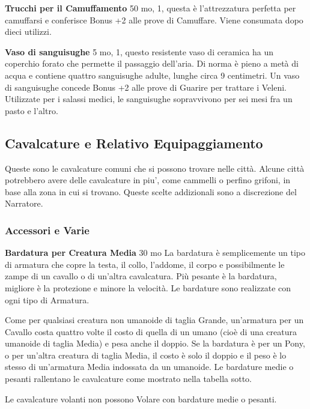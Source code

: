 \documentclass[a4paper,11pt,twoside,openany]{book}
\begin{document}
{\textbf{Trucchi per il Camuffamento} 50 mo, 1, questa è l'attrezzatura perfetta per camuffarsi e conferisce Bonus +2 alle prove di Camuffare. Viene consumata dopo dieci utilizzi.

\textbf{Vaso di sanguisughe} 5 mo, 1, questo resistente vaso di ceramica ha un coperchio forato che permette il passaggio dell'aria. Di norma è pieno a metà di acqua e contiene quattro sanguisughe adulte, lunghe circa 9 centimetri.
Un vaso di sanguisughe concede Bonus +2 alle prove di Guarire per trattare i Veleni. Utilizzate per i salassi medici, le sanguisughe sopravvivono per sei mesi fra un pasto e l'altro.

\pagebreak

\subsection{Cavalcature e Relativo Equipaggiamento}

\label{cavalcature-e-relativo-equipaggiamento}

Queste sono le cavalcature comuni che si possono trovare nelle città. Alcune città potrebbero avere delle cavalcature in piu', come cammelli o perfino grifoni, in base alla zona in cui si trovano. Queste scelte addizionali sono a discrezione del Narratore.

\subsubsection{Accessori e Varie}

\label{accessori-e-varie}

\textbf{Bardatura per Creatura Media} 30 mo La bardatura è semplicemente un tipo di armatura che copre la testa, il collo, l'addome, il corpo e possibilmente le zampe di un cavallo o di un'altra cavalcatura. Più pesante è la bardatura, migliore è la protezione e minore la velocità. Le bardature sono realizzate con ogni tipo di Armatura.

Come per qualsiasi creatura non umanoide di taglia Grande, un'armatura per un Cavallo costa quattro volte il costo di quella di un umano (cioè di una creatura umanoide di taglia Media) e pesa anche il doppio. Se la bardatura è per un Pony, o per un'altra creatura di taglia Media, il costo è solo il doppio e il peso è lo stesso di un'armatura Media indossata da un umanoide. Le bardature medie o pesanti rallentano le cavalcature come mostrato nella tabella sotto.

Le cavalcature volanti non possono Volare con bardature medie o pesanti.

}
\end{document}
